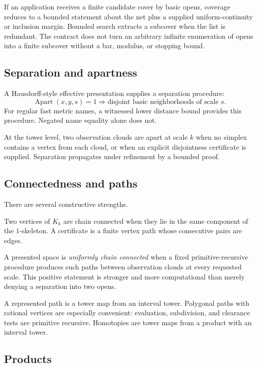If an application receives a finite candidate cover by basic opens, coverage reduces to a bounded statement about the net plus a supplied uniform-continuity or inclusion margin.  Bounded search extracts a subcover when the list is redundant.  The contract does not turn an arbitrary infinite enumeration of opens into a finite subcover without a bar, modulus, or stopping bound.

\subsection{Separation and apartness}

A Hausdorff-style effective presentation supplies a separation procedure:
\[
  \operatorname{Apart}(x,y,s)=1
  \Longrightarrow
  \text{disjoint basic neighborhoods of scale }s.
\]
For regular fast metric names, a witnessed lower distance bound provides this procedure.  Negated name equality alone does not.

At the tower level, two observation clouds are apart at scale $k$ when no simplex contains a vertex from each cloud, or when an explicit disjointness certificate is supplied.  Separation propagates under refinement by a bounded proof.

\subsection{Connectedness and paths}

There are several constructive strengths.

\begin{definition}
Two vertices of $K_k$ are chain connected when they lie in the same component of the $1$-skeleton.  A certificate is a finite vertex path whose consecutive pairs are edges.
\end{definition}

A presented space is \emph{uniformly chain connected} when a fixed primitive-recursive procedure produces such paths between observation clouds at every requested scale.  This positive statement is stronger and more computational than merely denying a separation into two opens.

A represented path is a tower map from an interval tower.  Polygonal paths with rational vertices are especially convenient: evaluation, subdivision, and clearance tests are primitive recursive.  Homotopies are tower maps from a product with an interval tower.

\subsection{Products}


